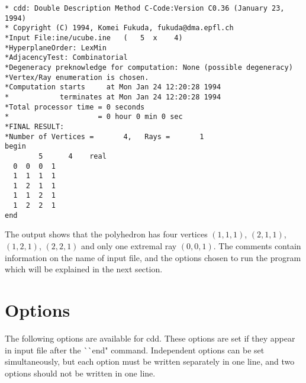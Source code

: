 \begin{verbatim}
* cdd: Double Description Method C-Code:Version C0.36 (January 23, 1994)
* Copyright (C) 1994, Komei Fukuda, fukuda@dma.epfl.ch
*Input File:ine/ucube.ine   (   5  x    4)
*HyperplaneOrder: LexMin
*AdjacencyTest: Combinatorial
*Degeneracy preknowledge for computation: None (possible degeneracy)
*Vertex/Ray enumeration is chosen.
*Computation starts     at Mon Jan 24 12:20:28 1994
*            terminates at Mon Jan 24 12:20:28 1994
*Total processor time = 0 seconds
*                     = 0 hour 0 min 0 sec
*FINAL RESULT:
*Number of Vertices =       4,   Rays =       1
begin
        5      4    real
  0  0  0  1
  1  1  1  1
  1  2  1  1
  1  1  2  1
  1  2  2  1
end
\end{verbatim}

The output shows that the polyhedron has four vertices
$(1,1,1)$, $(2,1,1)$, $(1,2,1)$,  $(2,2,1)$ and
only one extremal ray $(0,0,1)$.  The comments contain
information on the name of input file, and the options
chosen to run the program which will be explained in
the next section.

\newpage
\section{Options}  \label{OPTIONS}

The following options are available for cdd.  These options are
set if they appear in input file after the ^^ ^^ end" command.
Independent options can be set simultaneously, but each option
must be written separately in one line, and  two options
should not be written in one line.

